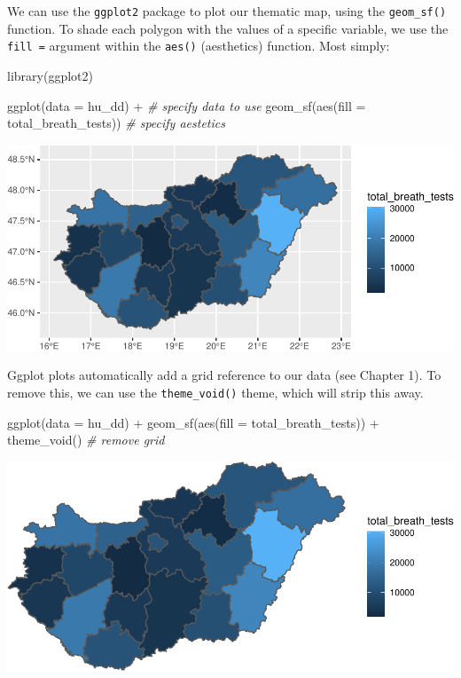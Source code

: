 \documentclass[
]{book}
\makeatletter
\newenvironment{Shaded}{\begin{snugshade}}{\end{snugshade}}
\newcommand{\AttributeTok}[1]{\textcolor[rgb]{0.61,0.61,0.61}{#1}}
\newcommand{\CommentTok}[1]{\textcolor[rgb]{0.37,0.37,0.37}{\textit{#1}}}
\newcommand{\FunctionTok}[1]{\textcolor[rgb]{0,0,0}{#1}}
\newcommand{\NormalTok}[1]{#1}
\newcommand{\SpecialCharTok}[1]{\textcolor[rgb]{0,0,0}{#1}}
\newenvironment{kframe}{%
\medskip{}
\setlength{\fboxsep}{.8em}
 \def\at@end@of@kframe{}%
 \ifinner\ifhmode%
  \def\at@end@of@kframe{\end{minipage}}%
  \begin{minipage}{\columnwidth}%
 \fi\fi%
 \def\FrameCommand##1{\hskip\@totalleftmargin \hskip-\fboxsep
 \colorbox{shadecolor}{##1}\hskip-\fboxsep
     \hskip-\linewidth \hskip-\@totalleftmargin \hskip\columnwidth}%
 \MakeFramed {\advance\hsize-\width
   \@totalleftmargin\z@ \linewidth\hsize
   \@setminipage}}%
 {\par\unskip\endMakeFramed%
 \at@end@of@kframe}
\renewenvironment{Shaded}{\begin{kframe}}{\end{kframe}}
\makeatother
\begin{document}
We can use the \texttt{ggplot2} package to plot our thematic map, using the \texttt{geom\_sf()} function. To shade each polygon with the values of a specific variable, we use the \texttt{fill\ =} argument within the \texttt{aes()} (aesthetics) function. Most simply:

\begin{Shaded}
\begin{Highlighting}[]
\FunctionTok{library}\NormalTok{(ggplot2)}

\FunctionTok{ggplot}\NormalTok{(}\AttributeTok{data =}\NormalTok{ hu\_dd) }\SpecialCharTok{+} \CommentTok{\# specify data to use}
  \FunctionTok{geom\_sf}\NormalTok{(}\FunctionTok{aes}\NormalTok{(}\AttributeTok{fill =}\NormalTok{ total\_breath\_tests)) }\CommentTok{\# specify aestetics }
\end{Highlighting}
\end{Shaded}

\includegraphics{crime_mapping_files/figure-latex/themmap-1.pdf}

Ggplot plots automatically add a grid reference to our data (see Chapter 1). To remove this, we can use the \texttt{theme\_void()} theme, which will strip this away.

\begin{Shaded}
\begin{Highlighting}[]
\FunctionTok{ggplot}\NormalTok{(}\AttributeTok{data =}\NormalTok{ hu\_dd) }\SpecialCharTok{+} 
  \FunctionTok{geom\_sf}\NormalTok{(}\FunctionTok{aes}\NormalTok{(}\AttributeTok{fill =}\NormalTok{ total\_breath\_tests)) }\SpecialCharTok{+} 
  \FunctionTok{theme\_void}\NormalTok{()  }\CommentTok{\# remove grid }
\end{Highlighting}
\end{Shaded}

\includegraphics{crime_mapping_files/figure-latex/themmapthemevoid-1.pdf}
\end{document}
